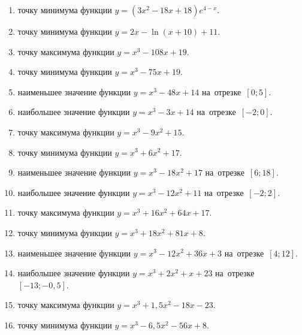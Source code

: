 \documentclass[a4paper,10pt]{article}
\begin{document}
\begin{enumerate}
\item {} точку минимума функции $y=\left(3x^2-18x+18\right){{e}^{4-x}}$.

\item {} точку минимума функции $y=2x-\ln \left(x+10\right)+11$.

\item {} точку максимума функции $y=x^3 -108x +19$.

\item {} точку минимума функции $y=x^3 -75x+19$.

\item {} наименьшее значение функции $y=x^3 -48x+14$ на~отрезке~$\left[0;5\right]$.

\item {} наибольшее значение функции $y=x^3 -3x+14$ на~отрезке~$\left[-2;0\right]$.

\item {} точку максимума функции $y=x^3 -9x^2+15$.

\item {} точку минимума функции $y=x^3 +6x^2+17$.

\item {} наименьшее значение функции $y=x^3 -18x^2+17$ на~отрезке~$\left[6;18\right]$.

\item {} наибольшее значение функции $y=x^3 -12x^2+11$ на~отрезке~$\left[-2;2\right]$.

\item {} точку максимума функции $y=x^3 +16x^2+64x+17$.

\item {} точку минимума функции $y=x^3 +18x^2+81x+8$.

\item {} наименьшее значение функции $y=x^3 -12x^2+36x+3$ на~отрезке~$\left[4;12\right]$.

\item {} наибольшее значение функции $y=x^3 +2x^2+x+23$ на~отрезке~$\left[-13;-0,5\right]$.

\item {} точку максимума функции $y=x^3 +1,5x^2-18x-23$.

\item {} точку минимума функции $y=x^3 -6,5x^2-56x+8$.


\end{enumerate}
\end{document}
